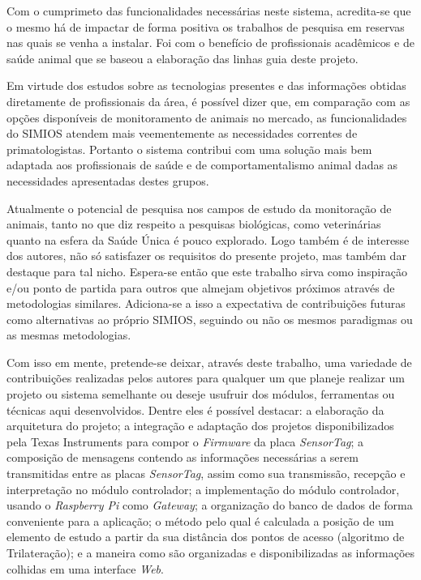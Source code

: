 Com o cumprimeto das funcionalidades necessárias neste sistema, acredita-se que o mesmo há de impactar de forma positiva os trabalhos de pesquisa em reservas nas quais se venha a instalar. Foi com o benefício de profissionais acadêmicos e de saúde animal que se baseou a elaboração das linhas guia deste projeto.

Em virtude dos estudos sobre as tecnologias presentes e das informações obtidas diretamente de profissionais da área, é possível dizer que, em comparação com as opções disponíveis de monitoramento de animais no mercado, as funcionalidades do SIMIOS atendem mais veementemente as necessidades correntes de primatologistas. Portanto o sistema contribui com uma solução mais bem adaptada aos profissionais de saúde e de comportamentalismo animal dadas as necessidades apresentadas destes grupos.

Atualmente o potencial de pesquisa nos campos de estudo da monitoração de animais, tanto no que diz respeito a pesquisas biológicas, como veterinárias quanto na esfera da Saúde Única é pouco explorado. Logo também é de interesse dos autores, não só satisfazer os requisitos do presente projeto, mas também dar destaque para tal nicho. Espera-se então que este trabalho sirva como inspiração e/ou ponto de partida para outros que almejam objetivos próximos através de metodologias similares. Adiciona-se a isso a expectativa de contribuições futuras como alternativas ao próprio SIMIOS, seguindo ou não os mesmos paradigmas ou as mesmas metodologias.

Com isso em mente, pretende-se deixar, através deste trabalho, uma variedade de contribuições realizadas pelos autores para qualquer um que planeje realizar um projeto ou sistema semelhante ou deseje usufruir dos módulos, ferramentas ou técnicas aqui desenvolvidos. Dentre eles é possível destacar: a elaboração da arquitetura do projeto; a integração e adaptação dos projetos disponibilizados pela Texas Instruments para compor o \emph{Firmware} da placa \emph{SensorTag}; a composição de mensagens contendo as informações necessárias a serem transmitidas entre as placas \emph{SensorTag}, assim como sua transmissão, recepção e interpretação no módulo controlador; a implementação do módulo controlador, usando o \emph{Raspberry Pi} como \emph{Gateway}; a organização do banco de dados de forma conveniente para a aplicação; o método pelo qual é calculada a posição de um elemento de estudo a partir da sua distância dos pontos de acesso (algoritmo de Trilateração); e a maneira como são organizadas e disponibilizadas as informações colhidas em uma interface \emph{Web}.


